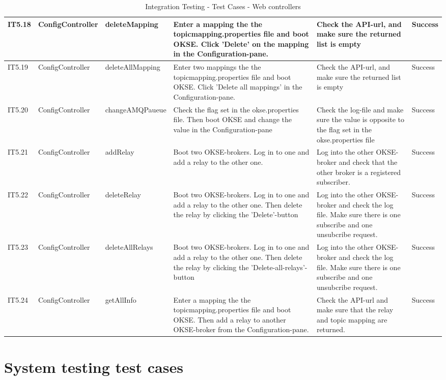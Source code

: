 \begin{table}[ht!]
\begin{tabular}{|m{0.5cm}|m{1.5cm}|m{1.5cm}|m{3cm}|m{3cm}|m{1.5cm}|}
IT5.18 & ConfigController & deleteMapping & Enter a mapping the the topicmapping.properties file and boot OKSE. Click 'Delete' on the mapping in the Configuration-pane. & Check the API-url, and make sure the returned list is empty & Success \\ \hline
IT5.19 & ConfigController & deleteAllMapping & Enter two mappings the the topicmapping.properties file and boot OKSE. Click 'Delete all mappings' in the Configuration-pane. & Check the API-url, and make sure the returned list is empty & Success \\ \hline
IT5.20 & ConfigController & changeAMQPaueue & Check the flag set in the okse.properties file. Then boot OKSE and change the value in the Configuration-pane & Check the log-file and make sure the value is opposite to the flag set in the okse.properties file & Success \\ \hline
IT5.21 & ConfigController & addRelay & Boot two OKSE-brokers. Log in to one and add a relay to the other one. & Log into the other OKSE-broker and check that the other broker is a registered subscriber. & Success \\ \hline
IT5.22 & ConfigController & deleteRelay & Boot two OKSE-brokers. Log in to one and add a relay to the other one. Then delete the relay by clicking the 'Delete'-button & Log into the other OKSE-broker and check the log file. Make sure there is one subscribe and one unsubcribe request. & Success \\ \hline
IT5.23 & ConfigController & deleteAllRelays & Boot two OKSE-brokers. Log in to one and add a relay to the other one. Then delete the relay by clicking the 'Delete-all-relays'-button & Log into the other OKSE-broker and check the log file. Make sure there is one subscribe and one unsubcribe request. & Success \\ \hline
IT5.24 & ConfigController & getAllInfo & Enter a mapping the the topicmapping.properties file and boot OKSE. Then add a relay to another OKSE-broker from the Configuration-pane. & Check the API-url and make sure that the relay and topic mapping are returned. & Success \\ \hline
\end{tabular}
\caption{Integration Testing - Test Cases - Web controllers}
\label{table:integration-testing-cases-webcontroller}
\end{table}

\clearpage

\section{System testing test cases}
\label{appendix-c:system_test_cases}

